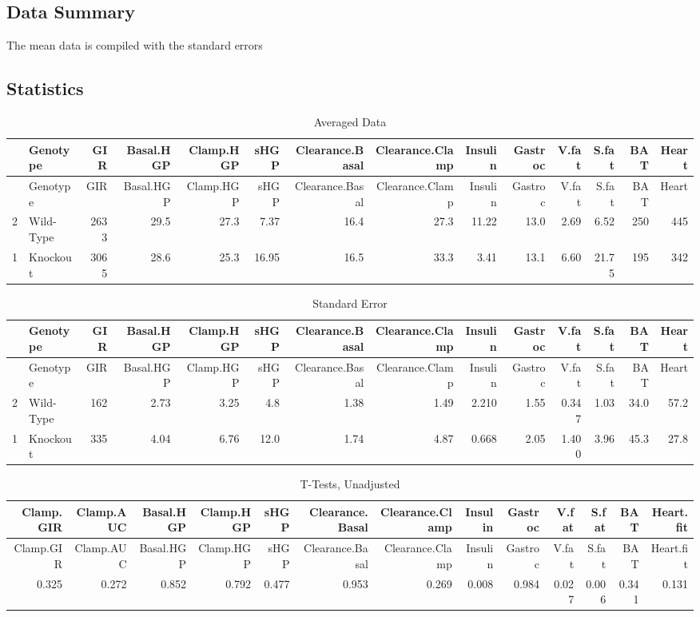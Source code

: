 \documentclass[]{article}
\begin{document}
\subsection{Data Summary}\label{data-summary}

The mean data is compiled with the standard errors

\subsection{Statistics}\label{statistics}

\begin{longtable}[]{@{}llrrrrrrrrrrrr@{}}
\caption{Averaged Data}\tabularnewline
\toprule
& Genotype & GIR & Basal.HGP & Clamp.HGP & sHGP & Clearance.Basal &
Clearance.Clamp & Insulin & Gastroc & V.fat & S.fat & BAT &
Heart\tabularnewline
\midrule
\endfirsthead
\toprule
& Genotype & GIR & Basal.HGP & Clamp.HGP & sHGP & Clearance.Basal &
Clearance.Clamp & Insulin & Gastroc & V.fat & S.fat & BAT &
Heart\tabularnewline
\midrule
\endhead
2 & Wild-Type & 2633 & 29.5 & 27.3 & 7.37 & 16.4 & 27.3 & 11.22 & 13.0 &
2.69 & 6.52 & 250 & 445\tabularnewline
1 & Knockout & 3065 & 28.6 & 25.3 & 16.95 & 16.5 & 33.3 & 3.41 & 13.1 &
6.60 & 21.75 & 195 & 342\tabularnewline
\bottomrule
\end{longtable}

\begin{longtable}[]{@{}llrrrrrrrrrrrr@{}}
\caption{Standard Error}\tabularnewline
\toprule
& Genotype & GIR & Basal.HGP & Clamp.HGP & sHGP & Clearance.Basal &
Clearance.Clamp & Insulin & Gastroc & V.fat & S.fat & BAT &
Heart\tabularnewline
\midrule
\endfirsthead
\toprule
& Genotype & GIR & Basal.HGP & Clamp.HGP & sHGP & Clearance.Basal &
Clearance.Clamp & Insulin & Gastroc & V.fat & S.fat & BAT &
Heart\tabularnewline
\midrule
\endhead
2 & Wild-Type & 162 & 2.73 & 3.25 & 4.8 & 1.38 & 1.49 & 2.210 & 1.55 &
0.347 & 1.03 & 34.0 & 57.2\tabularnewline
1 & Knockout & 335 & 4.04 & 6.76 & 12.0 & 1.74 & 4.87 & 0.668 & 2.05 &
1.400 & 3.96 & 45.3 & 27.8\tabularnewline
\bottomrule
\end{longtable}

\begin{longtable}[]{@{}rrrrrrrrrrrrr@{}}
\caption{T-Tests, Unadjusted}\tabularnewline
\toprule
Clamp.GIR & Clamp.AUC & Basal.HGP & Clamp.HGP & sHGP & Clearance.Basal &
Clearance.Clamp & Insulin & Gastroc & V.fat & S.fat & BAT &
Heart.fit\tabularnewline
\midrule
\endfirsthead
\toprule
Clamp.GIR & Clamp.AUC & Basal.HGP & Clamp.HGP & sHGP & Clearance.Basal &
Clearance.Clamp & Insulin & Gastroc & V.fat & S.fat & BAT &
Heart.fit\tabularnewline
\midrule
\endhead
0.325 & 0.272 & 0.852 & 0.792 & 0.477 & 0.953 & 0.269 & 0.008 & 0.984 &
0.027 & 0.006 & 0.341 & 0.131\tabularnewline
\bottomrule
\end{longtable}
\end{document}
